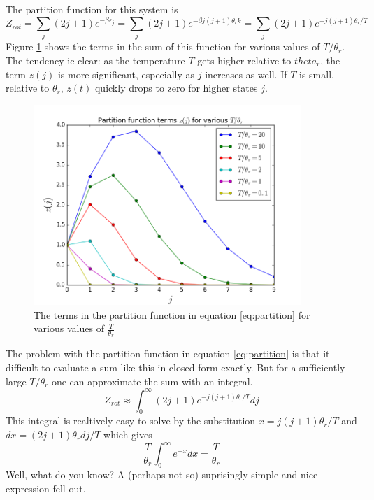 \documentclass[10pt,a4paper]{amsart}
\begin{document}
The partition function for this system is
\begin{equation}
\label{eq:partition}
Z_{rot} = \sum_j (2j + 1)e^{-\beta\varepsilon_j} 
        = \sum_j (2j + 1)e^{-\beta j(j+1)\theta_r k}
        = \sum_j (2j + 1)e^{-j(j+1)\theta_r/T}
\end{equation}
Figure \ref{fig:partitionterms} shows the terms in the sum of this function for various values of $T/\theta_r$. The tendency ic clear: as the temperature $T$ gets higher relative to $theta_r$, the term $z(j)$ is more significant, especially as $j$ increases as well. If $T$ is small, relative to $\theta_r$, $z(t)$ quickly drops to zero for higher states $j$. 

\begin{figure}
	\centering
	\includegraphics[width=0.9\textwidth]{figures/partitionterms.png}
	\caption{The terms in the partition function in equation \ref{eq:partition} for various values of $\frac{T}{\theta_r}$}
	\label{fig:partitionterms}
\end{figure}

The problem with the partition function in equation \ref{eq:partition} is that it difficult to evaluate a sum like this in closed form exactly. But for a sufficiently large $T/\theta_r$ one can approximate the sum with an integral.
\begin{equation}
Z_{rot} \approx \int_0^{\infty} (2j+1)e^{-j(j+1)\theta_r/T}dj
\end{equation}
This integral is realtively easy to solve by the substitution $x=j(j+1)\theta_r/T$ and $dx = (2j+1)\theta_r dj/T$ which gives
\begin{equation}
\frac{T}{\theta_r}\int_0^{\infty}e^{-x}dx=\frac{T}{\theta_r}
\end{equation}
Well, what do you know? A (perhaps not so) suprisingly simple and nice expression fell out.
\end{document}
